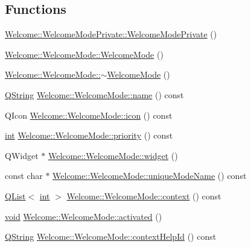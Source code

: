 \subsection*{Functions}
\begin{DoxyCompactItemize}
\item 
\hyperlink{group___welcome_plugin_ga75edcc8b045b7553f7bb09bde3a0a491}{Welcome\-::\-Welcome\-Mode\-Private\-::\-Welcome\-Mode\-Private} ()
\item 
\hyperlink{group___welcome_plugin_gaddea844272aa36b99c5ebe5e095a70ab}{Welcome\-::\-Welcome\-Mode\-::\-Welcome\-Mode} ()
\item 
\hyperlink{group___welcome_plugin_ga5c6c667541394b36ddf50c9ae263f9b2}{Welcome\-::\-Welcome\-Mode\-::$\sim$\-Welcome\-Mode} ()
\item 
\hyperlink{group___u_a_v_objects_plugin_gab9d252f49c333c94a72f97ce3105a32d}{Q\-String} \hyperlink{group___welcome_plugin_ga7586dbc104467d1a590fa2e0d723ab5c}{Welcome\-::\-Welcome\-Mode\-::name} () const 
\item 
Q\-Icon \hyperlink{group___welcome_plugin_ga88caad9f6c1d3a4d16f7ee399706cf86}{Welcome\-::\-Welcome\-Mode\-::icon} () const 
\item 
\hyperlink{ioapi_8h_a787fa3cf048117ba7123753c1e74fcd6}{int} \hyperlink{group___welcome_plugin_gae1d1437fdc5e83102dc1da5cc809834f}{Welcome\-::\-Welcome\-Mode\-::priority} () const 
\item 
Q\-Widget $\ast$ \hyperlink{group___welcome_plugin_gad367aa736459da2ada111a3944f2a28d}{Welcome\-::\-Welcome\-Mode\-::widget} ()
\item 
const char $\ast$ \hyperlink{group___welcome_plugin_gaddd517d76cbff2b9bb0c8e0d672bdcab}{Welcome\-::\-Welcome\-Mode\-::unique\-Mode\-Name} () const 
\item 
\hyperlink{class_q_list}{Q\-List}$<$ \hyperlink{ioapi_8h_a787fa3cf048117ba7123753c1e74fcd6}{int} $>$ \hyperlink{group___welcome_plugin_ga740b152623be8ca1d5f9f22e2b4b5bc4}{Welcome\-::\-Welcome\-Mode\-::context} () const 
\item 
\hyperlink{group___u_a_v_objects_plugin_ga444cf2ff3f0ecbe028adce838d373f5c}{void} \hyperlink{group___welcome_plugin_gac79769eb6bfa95dfa1be3459b92e1d60}{Welcome\-::\-Welcome\-Mode\-::activated} ()
\item 
\hyperlink{group___u_a_v_objects_plugin_gab9d252f49c333c94a72f97ce3105a32d}{Q\-String} \hyperlink{group___welcome_plugin_ga5350ee5cd5a50d966eb0b2522e888183}{Welcome\-::\-Welcome\-Mode\-::context\-Help\-Id} () const 
\item 

\end{DoxyCompactItemize}
